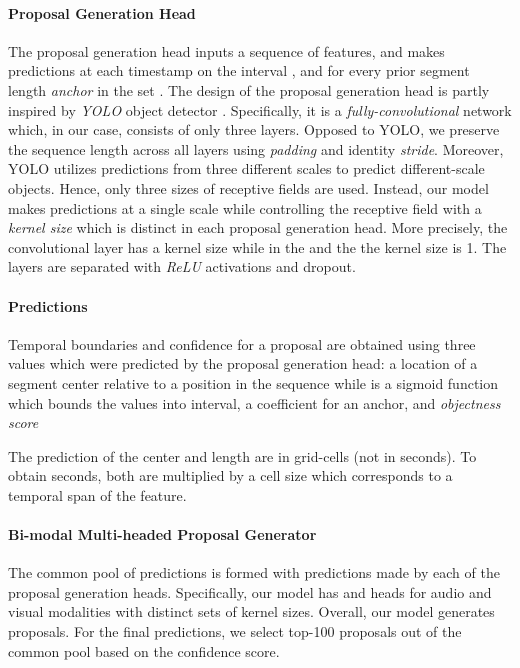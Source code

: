 \documentclass{src/bmvc2k}
\begin{document}
\vspace{-2.3ex}\paragraph{Proposal Generation Head} The proposal generation head inputs a sequence of  features, and makes predictions at each timestamp on the interval , and for every prior segment length \textit{anchor} in the set . The design of the proposal generation head is partly inspired by \textit{YOLO} object detector \cite{YOLOv1_Redmon_2016,YOLOv2_Redmon_2016,YOLOv3_Redmon_2018}. Specifically, it is a \textit{fully-convolutional} network which, in our case, consists of only three layers. Opposed to YOLO, we preserve the sequence length across all layers using \textit{padding} and identity \textit{stride}. Moreover, YOLO utilizes predictions from three different scales to predict different-scale objects. Hence, only three sizes of receptive fields are used. Instead, our model makes predictions at a single scale while controlling the receptive field with a \textit{kernel size}  which is distinct in each proposal generation head. More precisely, the  convolutional layer has a kernel size  while in the  and the  the kernel size is 1. The layers are separated with \textit{ReLU} activations and dropout.

\vspace{-2ex}\paragraph{Predictions} Temporal boundaries and confidence for a proposal are obtained using three values which were predicted by the proposal generation head: a location of a segment center  relative to a position  in the sequence while  is a sigmoid function which bounds the values into  interval, a coefficient  for an anchor, and \textit{objectness score} 

The prediction of the center and length are in grid-cells (not in seconds). To obtain seconds, both are multiplied by a cell size which corresponds to a temporal span of the feature.

\vspace{-2ex}\paragraph{Bi-modal Multi-headed Proposal Generator}
The common pool of predictions is formed with predictions made by each of the proposal generation heads. Specifically, our model has  and  heads for audio and visual modalities with distinct sets of kernel sizes. Overall, our model generates  proposals. For the final predictions, we select top-100 proposals out of the common pool based on the confidence score.
\end{document}
